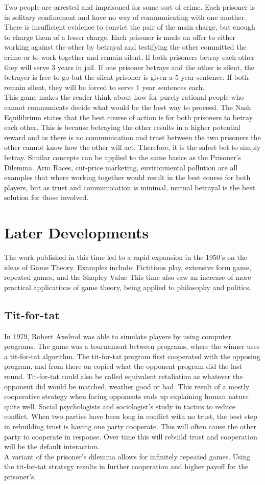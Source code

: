 \documentclass[12pt]{article}
\begin{document}
 		Two people are arrested and imprisoned for some sort of crime. Each prisoner is in solitary confinement and have no way of communicating with one another. There is insufficient evidence to convict the pair of the main charge, but enough to charge them of a lesser charge. Each prisoner is made an offer to either working against the other by betrayal and testifying the other committed the crime or to work together and remain silent. If both prisoners betray each other they will serve 3 years in jail. If one prisoner betrays and the other is silent, the betrayer is free to go but the silent prisoner is given a 5 year sentence. If both remain silent, they will be forced to serve 1 year sentences each.\\
 	This game makes the reader think about how for purely rational people who cannot communicate decide what would be the best way to proceed.
 	The Nash Equilibrium states that the best course of action is for both prisoners to betray each other. This is because betraying the other results in a higher potential reward and as there is no communication and trust between the two prisoners the other cannot know how the other will act. Therefore, it is the safest bet to simply betray. Similar concepts can be applied to the same basics as the Prisoner's Dilemma. Arm Races, cut-price marketing, environmental pollution are all examples that where working together would result in the best course for both players, but as trust and communication is minimal, mutual betrayal is the best solution for those involved.  
 	\section{Later Developments}
 	The work published in this time led to a rapid expansion in the 1950's on the ideas of Game Theory. Examples include: Fictitious play, extensive form game, repeated games, and the Shapley Value  This time also saw an increase of more practical applications of game theory, being applied to philosophy and politics.
 	\subsection{Tit-for-tat}
 	 In 1979, Robert Axelrod was able to simulate players by using computer programs. The game was a tournament between programs, where the winner uses a tit-for-tat algorithm. The tit-for-tat program first cooperated with the opposing program, and from there on copied what the opponent program did the last round. Tit-for-tat could also be called equivalent retaliation as whatever the opponent did would be matched, weather good or bad. This result of a mostly cooperative strategy when facing opponents ends up explaining human nature quite well. Social psychologists and sociologist's study in tactics to reduce conflict. When two parties have been long in conflict with no trust, the best step in rebuilding trust is having one party cooperate. This will often cause the other party to cooperate in response. Over time this will rebuild trust and cooperation will be the default interaction. \\
 	 A variant of the prisoner's dilemma allows for infinitely repeated games. Using the tit-for-tat strategy results in further cooperation and higher payoff for the prisoner's. 
\end{document}
